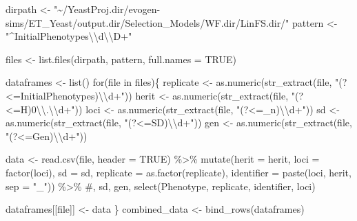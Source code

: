 \documentclass[
  letterpaper,
  DIV=11,
  numbers=noendperiod]{scrartcl}
\newenvironment{Shaded}{\begin{snugshade}}{\end{snugshade}}
\newcommand{\AttributeTok}[1]{\textcolor[rgb]{0.40,0.46,0.14}{#1}}
\newcommand{\CommentTok}[1]{\textcolor[rgb]{0.37,0.37,0.37}{#1}}
\newcommand{\ConstantTok}[1]{\textcolor[rgb]{0.56,0.35,0.01}{#1}}
\newcommand{\ControlFlowTok}[1]{\textcolor[rgb]{0.00,0.46,0.62}{#1}}
\newcommand{\FunctionTok}[1]{\textcolor[rgb]{0.28,0.35,0.67}{#1}}
\newcommand{\NormalTok}[1]{\textcolor[rgb]{0.00,0.46,0.62}{#1}}
\newcommand{\OtherTok}[1]{\textcolor[rgb]{0.00,0.46,0.62}{#1}}
\newcommand{\SpecialCharTok}[1]{\textcolor[rgb]{0.37,0.37,0.37}{#1}}
\newcommand{\StringTok}[1]{\textcolor[rgb]{0.13,0.47,0.30}{#1}}
\begin{document}
\begin{Shaded}
\begin{Highlighting}[]
\NormalTok{dirpath }\OtherTok{\textless{}{-}} \StringTok{"\textasciitilde{}/YeastProj.dir/evogen{-}sims/ET\_Yeast/output.dir/Selection\_Models/WF.dir/LinFS.dir/"}
\NormalTok{pattern }\OtherTok{\textless{}{-}} \StringTok{"\^{}InitialPhenotypes}\SpecialCharTok{\textbackslash{}\textbackslash{}}\StringTok{d}\SpecialCharTok{\textbackslash{}\textbackslash{}}\StringTok{D+"}

\NormalTok{files }\OtherTok{\textless{}{-}} \FunctionTok{list.files}\NormalTok{(dirpath, pattern, }\AttributeTok{full.names =} \ConstantTok{TRUE}\NormalTok{)}
  
\NormalTok{  dataframes }\OtherTok{\textless{}{-}} \FunctionTok{list}\NormalTok{()}
  \ControlFlowTok{for}\NormalTok{(file }\ControlFlowTok{in}\NormalTok{ files)\{}
\NormalTok{    replicate }\OtherTok{\textless{}{-}} \FunctionTok{as.numeric}\NormalTok{(}\FunctionTok{str\_extract}\NormalTok{(file, }\StringTok{"(?\textless{}=InitialPhenotypes)}\SpecialCharTok{\textbackslash{}\textbackslash{}}\StringTok{d+"}\NormalTok{))}
\NormalTok{    herit }\OtherTok{\textless{}{-}} \FunctionTok{as.numeric}\NormalTok{(}\FunctionTok{str\_extract}\NormalTok{(file, }\StringTok{"(?\textless{}=H)0}\SpecialCharTok{\textbackslash{}\textbackslash{}}\StringTok{.}\SpecialCharTok{\textbackslash{}\textbackslash{}}\StringTok{d+"}\NormalTok{))}
\NormalTok{    loci }\OtherTok{\textless{}{-}} \FunctionTok{as.numeric}\NormalTok{(}\FunctionTok{str\_extract}\NormalTok{(file, }\StringTok{"(?\textless{}=\_n)}\SpecialCharTok{\textbackslash{}\textbackslash{}}\StringTok{d+"}\NormalTok{))}
\NormalTok{    sd }\OtherTok{\textless{}{-}} \FunctionTok{as.numeric}\NormalTok{(}\FunctionTok{str\_extract}\NormalTok{(file, }\StringTok{"(?\textless{}=SD)}\SpecialCharTok{\textbackslash{}\textbackslash{}}\StringTok{d+"}\NormalTok{))}
\NormalTok{    gen }\OtherTok{\textless{}{-}} \FunctionTok{as.numeric}\NormalTok{(}\FunctionTok{str\_extract}\NormalTok{(file, }\StringTok{"(?\textless{}=Gen)}\SpecialCharTok{\textbackslash{}\textbackslash{}}\StringTok{d+"}\NormalTok{))}
    
\NormalTok{    data }\OtherTok{\textless{}{-}} \FunctionTok{read.csv}\NormalTok{(file, }\AttributeTok{header =} \ConstantTok{TRUE}\NormalTok{) }\SpecialCharTok{\%\textgreater{}\%} 
      \FunctionTok{mutate}\NormalTok{(}\AttributeTok{herit =}\NormalTok{ herit, }\AttributeTok{loci =} \FunctionTok{factor}\NormalTok{(loci), }\AttributeTok{sd =}\NormalTok{ sd,}
             \AttributeTok{replicate =} \FunctionTok{as.factor}\NormalTok{(replicate),}
           \AttributeTok{identifier =} \FunctionTok{paste}\NormalTok{(loci, herit, }\AttributeTok{sep =} \StringTok{"\_"}\NormalTok{)) }\SpecialCharTok{\%\textgreater{}\%} \CommentTok{\#, sd, gen, }
      \FunctionTok{select}\NormalTok{(Phenotype, replicate, identifier, loci)}
    
\NormalTok{    dataframes[[file]] }\OtherTok{\textless{}{-}}\NormalTok{ data}
\NormalTok{  \}}
\NormalTok{  combined\_data }\OtherTok{\textless{}{-}} \FunctionTok{bind\_rows}\NormalTok{(dataframes) }
\end{Highlighting}
\end{Shaded}
\end{document}

